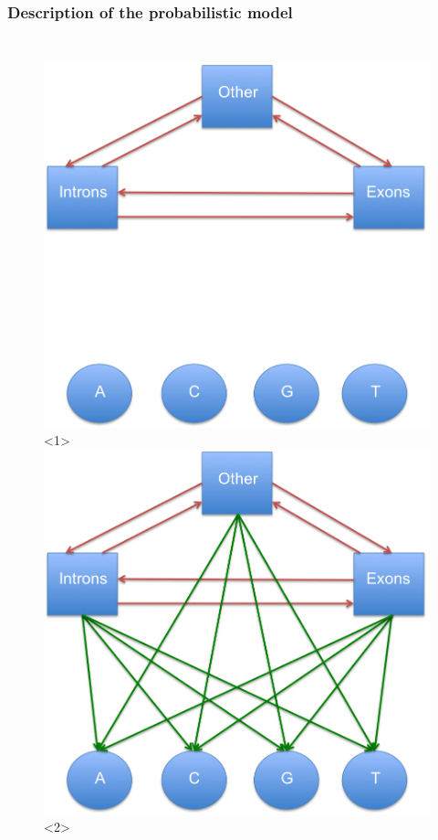\documentclass{beamer}
\begin{document}
\begin{frame}
\frametitle{Description of the probabilistic model}
\begin{columns}

		\begin{figure}[h]
			\centering
			\includegraphics[width=1.0\textwidth]{../picturesforthepresentation/HMM1.png}<1>
			\includegraphics[width=1.0\textwidth]{../picturesforthepresentation/HMM2.png}<2>		
		\end{figure}
		

\end{columns}
\end{frame}
\end{document}
